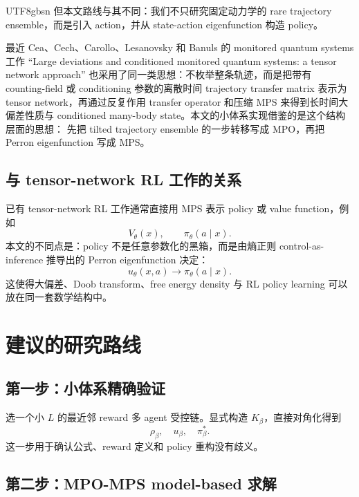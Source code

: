 \documentclass[11pt]{article}
\begin{document}
\begin{CJK*}{UTF8}{gbsn}
但本文路线与其不同：我们不只研究固定动力学的 rare trajectory ensemble，而是引入 action，并从
state-action eigenfunction 构造 policy。

最近 Cea、Cech、Carollo、Lesanovsky 和 Banuls 的 monitored quantum systems 工作
``Large deviations and conditioned monitored quantum systems: a tensor network approach''
也采用了同一类思想：不枚举整条轨迹，而是把带有 counting-field 或 conditioning 参数的离散时间
trajectory transfer matrix 表示为 tensor network，再通过反复作用 transfer operator 和压缩 MPS
来得到长时间大偏差性质与 conditioned many-body state。本文的小体系实现借鉴的是这个结构层面的思想：
先把 tilted trajectory ensemble 的一步转移写成 MPO，再把 Perron eigenfunction 写成 MPS。

\subsection{与 tensor-network RL 工作的关系}

已有 tensor-network RL 工作通常直接用 MPS 表示 policy 或 value function，例如
\begin{equation}
    V_\theta(x),
    \qquad
    \pi_\theta(a\mid x).
\end{equation}
本文的不同点是：policy 不是任意参数化的黑箱，而是由熵正则 control-as-inference 推导出的
Perron eigenfunction 决定：
\begin{equation}
    u_\theta(x,a)
    \longrightarrow
    \pi_\theta(a\mid x).
\end{equation}
这使得大偏差、Doob transform、free energy density 与 RL policy learning 可以放在同一套数学结构中。

\section{建议的研究路线}

\subsection{第一步：小体系精确验证}

选一个小 \(L\) 的最近邻 reward 多 agent 受控链。显式构造 \(K_\beta\)，直接对角化得到
\begin{equation}
    \rho_\beta,\quad u_\beta,\quad \pi_\beta^*.
\end{equation}
这一步用于确认公式、reward 定义和 policy 重构没有歧义。

\subsection{第二步：MPO-MPS model-based 求解}


\end{CJK*}
\end{document}
